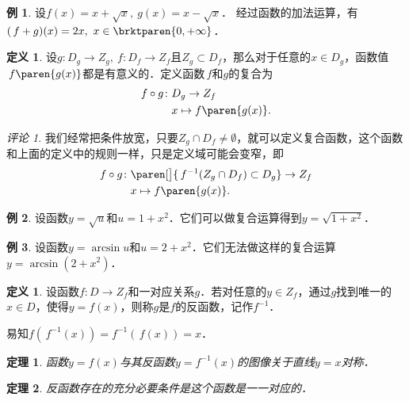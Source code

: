 \documentclass[a4paper,punct=CCT]{ctexbook}
\newtheorem*{theorem*}{定理}
\theoremstyle{definition}
\newtheorem{definition}{定义}
\newtheorem*{definition*}{定义}
\newtheorem*{example*}{例}
\theoremstyle{remark}
\newtheorem*{remark}{评论}
\begin{document}
\begin{example*}
  设\(f(x) = x + \sqrt x,\ g(x) = x - \sqrt x\)．
  经过函数的加法运算，有\((\,f+g)(x) = 2x,\ x \in \brktparen{0, +\infty}\)．
\end{example*}

\begin{definition*}
  设\(g\colon D_g \to Z_g,\ f\colon D_f \to Z_f\)且\(Z_g \subset D_f\)，那么对于任意的\(x \in D_g\)，函数值\(\,f\paren{g(x)}\)都是有意义的．定义函数\(\,f\)和\(g\)的复合为
  \[
    \begin{split}
      f \circ g\colon & D_g \to Z_f \\
      & x \mapsto f\paren{g(x)}.
    \end{split}
  \]

  \begin{remark}
    我们经常把条件放宽，只要\(Z_g \cap D_f \ne \emptyset\)，就可以定义复合函数，这个函数和上面的定义中的规则一样，只是定义域可能会变窄，即
    \[
      \begin{split}
        f \circ g\colon & \paren[\big]{\,f^{-1}(Z_g \cap D_f) \subset D_g} \to Z_f \\
        & x \mapsto f\paren{g(x)}.
      \end{split}
    \]
  \end{remark}
\end{definition*}

\begin{example*}
  设函数\(y = \sqrt u\)和\(u = 1+x^2\)．它们可以做复合运算得到\(y = \sqrt{1+x^2}\)．
\end{example*}

\begin{example*}
  设函数\(y = \arcsin u\)和\(u = 2+x^2\)．它们无法做这样的复合运算\(y = \arcsin(2+x^2)\)．
\end{example*}

\begin{definition}
  \label{defn:funcinv}
  设函数\(f\colon D \to Z_f\)和一对应关系\(g\)．若对任意的\(y \in Z_f\)，通过\(g\)找到唯一的\(x \in D\)，使得\(y = f(x)\)，则称\(g\)是\(f\)的反函数，记作\(f^{-1}\)．
\end{definition}

易知\(f(\,f^{-1}(x)) = f^{-1}(\,f(x)) = x\)．

\begin{theorem*}
  函数\(y = f(x)\)与其反函数\(y = f^{-1}(x)\)的图像关于直线\(y = x\)对称．
\end{theorem*}

\begin{theorem*}
  反函数存在的充分必要条件是这个函数是一一对应的．
\end{theorem*}
\end{document}
